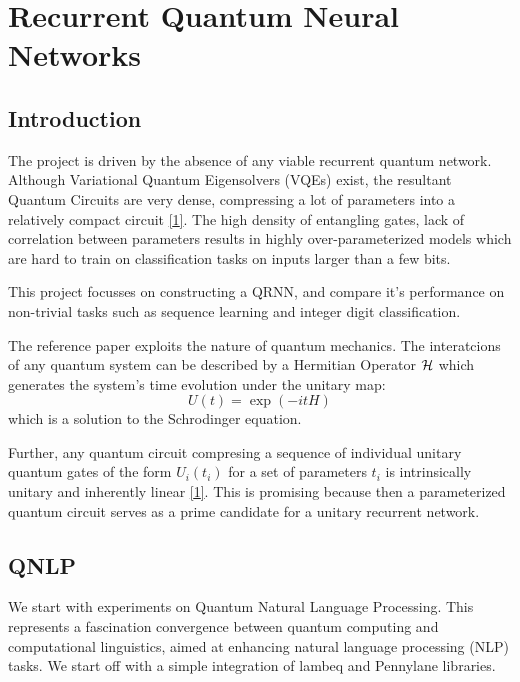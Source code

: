 \hypertarget{recurrent-quantum-neural-networks}{%
\section{Recurrent Quantum Neural
Networks}\label{recurrent-quantum-neural-networks}}

\hypertarget{introduction}{%
\subsection{Introduction}\label{introduction}}

The project is driven by the absence of any viable recurrent quantum
network. Although Variational Quantum Eigensolvers (VQEs) exist, the
resultant Quantum Circuits are very dense, compressing a lot of
parameters into a relatively compact circuit
\protect\hyperlink{quantum-neuron-an-elementary-building-block-for-machine-learning-on-quantum-computers}{{[}1{]}}.
The high density of entangling gates, lack of correlation between
parameters results in highly over-parameterized models which are hard to
train on classification tasks on inputs larger than a few bits.

This project focusses on constructing a QRNN, and compare it's
performance on non-trivial tasks such as sequence learning and integer
digit classification.

The reference paper exploits the nature of quantum mechanics. The
interatcions of any quantum system can be described by a Hermitian
Operator \(\bold{\mathcal{H}}\) which generates the system's time
evolution under the unitary map: \[U(t) = \exp(-itH)\] which is a
solution to the Schrodinger equation.

Further, any quantum circuit compresing a sequence of individual unitary
quantum gates of the form \(U_i(t_i)\) for a set of parameters \(t_i\)
is intrinsically unitary and inherently linear
\protect\hyperlink{recurrent-quantum-neural-networks-1}{{[}1{]}}. This
is promising because then a parameterized quantum circuit serves as a
prime candidate for a unitary recurrent network.

\hypertarget{qnlp}{%
\subsection{QNLP}\label{qnlp}}

We start with experiments on Quantum Natural Language Processing. This
represents a fascination convergence between quantum computing and
computational linguistics, aimed at enhancing natural language
processing (NLP) tasks. We start off with a simple integration of lambeq
and Pennylane libraries.

